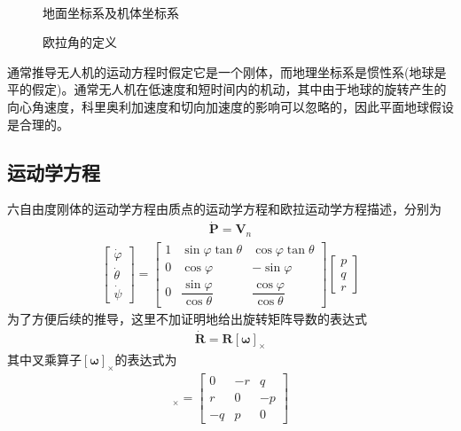 \begin{figure}[htbp]
\begin{minipage}[c]{0.5\textwidth}
	\end{minipage}\\[1pt]
	\begin{minipage}[t]{.5\textwidth}
		\caption{\label{fig_NED_B}地面坐标系及机体坐标系}
	\end{minipage}%
	\begin{minipage}[t]{.5\textwidth}
		\caption{\label{fig_euler}欧拉角的定义}
	\end{minipage}%
\end{figure}
通常推导无人机的运动方程时假定它是一个刚体，而地理坐标系是惯性系(地球是平的假定)。通常无人机在低速度和短时间内的机动，其中由于地球的旋转产生的向心角速度，科里奥利加速度和切向加速度的影响可以忽略的，因此平面地球假设是合理的。
\subsection{运动学方程}
六自由度刚体的运动学方程由质点的运动学方程和欧拉运动学方程描述，分别为
\begin{align}
\dot{\bm{P}}=\bm{V}_n	\label{eq_k_pos}
\end{align}
\begin{align}
\begin{bmatrix}
\dot{\varphi} \\
\dot{\theta} \\
\dot{\psi}
\end{bmatrix}=
\begin{bmatrix}
1 & \sin \varphi \tan \theta & \cos \varphi \tan \theta \\
0 & \cos \varphi & -\sin \varphi \\
0 & \dfrac{\sin \varphi}{\cos \theta} & \dfrac{\cos \varphi}{\cos \theta}
\end{bmatrix}
\begin{bmatrix}
p \\
q \\
r
\end{bmatrix}	\label{eq_k_euler}
\end{align}
为了方便后续的推导，这里不加证明地给出旋转矩阵导数的表达式
\begin{align}
\dot{\bm{R}}=\bm{R}[\bm{\omega}]_{\times} \label{eq_drot}
\end{align}
其中叉乘算子$ [\bm{\omega}]_{\times} $的表达式为
\begin{align}
[\bm{\omega}]_{\times}=
\begin{bmatrix}
0 & -r & q \\
r & 0 & -p \\
-q & p & 0
\end{bmatrix} 
\end{align}
